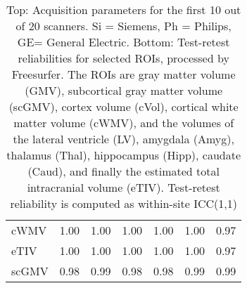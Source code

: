 \begin{table}
\begin{tabular}{lllllll}
cWMV                  &                 1.00 &                 1.00 &               1.00 &                1.00 &                1.00 &                0.97 \\
eTIV                  &                 1.00 &                 1.00 &               1.00 &                1.00 &                1.00 &                0.97 \\
scGMV                 &                 0.98 &                 0.99 &               0.98 &                0.98 &                0.99 &                0.99 \\
\bottomrule
\end{tabular}
\caption{Top: Acquisition parameters for the first 10 out of 20 scanners. Si = Siemens, Ph = Philips, GE= General Electric. Bottom: Test-retest reliabilities for selected ROIs, processed by Freesurfer. The ROIs are gray matter volume (GMV), subcortical gray matter volume (scGMV), cortex volume (cVol), cortical white matter volume (cWMV), and the volumes of the lateral ventricle (LV), amygdala (Amyg), thalamus (Thal), hippocampus (Hipp), caudate (Caud), and finally the estimated total intracranial volume (eTIV). Test-retest reliability is computed as within-site ICC(1,1)} 
\label{tab:acquisition1}

\end{table}